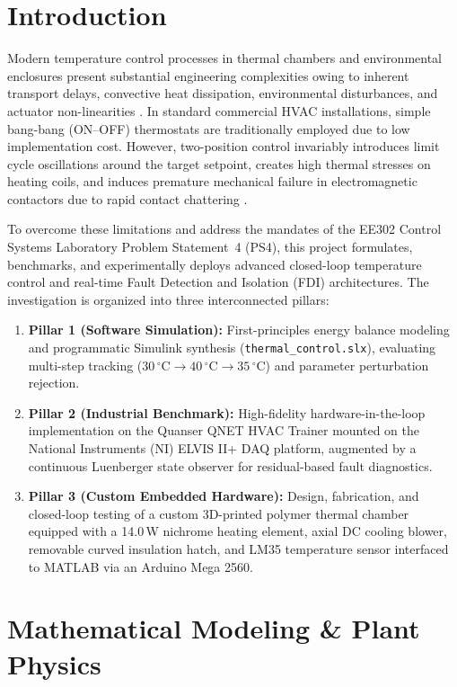 \documentclass[conference]{IEEEtran}
\begin{document}
\section{Introduction}
Modern temperature control processes in thermal chambers and environmental enclosures present substantial engineering complexities owing to inherent transport delays, convective heat dissipation, environmental disturbances, and actuator non-linearities \cite{astrom2006}. In standard commercial HVAC installations, simple bang-bang (ON--OFF) thermostats are traditionally employed due to low implementation cost. However, two-position control invariably introduces limit cycle oscillations around the target setpoint, creates high thermal stresses on heating coils, and induces premature mechanical failure in electromagnetic contactors due to rapid contact chattering \cite{ogata2010}.

To overcome these limitations and address the mandates of the EE302 Control Systems Laboratory Problem Statement~4 (PS4), this project formulates, benchmarks, and experimentally deploys advanced closed-loop temperature control and real-time Fault Detection and Isolation (FDI) architectures. The investigation is organized into three interconnected pillars:
\begin{enumerate}
    \item \textbf{Pillar 1 (Software Simulation):} First-principles energy balance modeling and programmatic Simulink synthesis (\texttt{thermal\_control.slx}), evaluating multi-step tracking ($30\,^\circ\text{C} \to 40\,^\circ\text{C} \to 35\,^\circ\text{C}$) and parameter perturbation rejection.
    \item \textbf{Pillar 2 (Industrial Benchmark):} High-fidelity hardware-in-the-loop implementation on the Quanser QNET HVAC Trainer mounted on the National Instruments (NI) ELVIS II+ DAQ platform, augmented by a continuous Luenberger state observer for residual-based fault diagnostics.
    \item \textbf{Pillar 3 (Custom Embedded Hardware):} Design, fabrication, and closed-loop testing of a custom 3D-printed polymer thermal chamber equipped with a 14.0\,W nichrome heating element, axial DC cooling blower, removable curved insulation hatch, and LM35 temperature sensor interfaced to MATLAB via an Arduino Mega 2560.
\end{enumerate}

\section{Mathematical Modeling \& Plant Physics}
\end{document}
